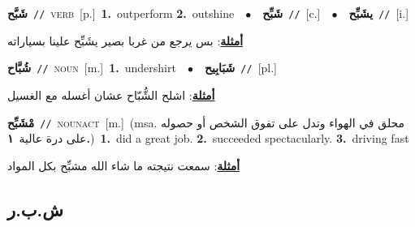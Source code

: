 \documentclass[10pt,a4paper,twoside]{article} %
\begin{document}
\begin{multicols}{2}
{\setlength\topsep{0pt}\textbf{\foreignlanguage{arabic}{شَبَّح}}\ {\color{gray}\texttt{//}\color{black}}\ \textsc{verb}\ [p.]\ \textbf{1.}~outperform  \textbf{2.}~outshine\ \ $\bullet$\ \ \setlength\topsep{0pt}\textbf{\foreignlanguage{arabic}{شَبِّح}}\ {\color{gray}\texttt{//}\color{black}}\ [c.]\ \ $\bullet$\ \ \setlength\topsep{0pt}\textbf{\foreignlanguage{arabic}{يشَبِّح}}\ {\color{gray}\texttt{//}\color{black}}\ [i.]\  \begin{flushright}\color{gray}\foreignlanguage{arabic}{\textbf{\underline{\foreignlanguage{arabic}{أمثلة}}}: بس يرجع من غربا بصير يشَبِّح علينا بسياراته}\end{flushright}\color{black}} \vspace{2mm}

{\setlength\topsep{0pt}\textbf{\foreignlanguage{arabic}{شُبَّاح}}\ {\color{gray}\texttt{//}\color{black}}\ \textsc{noun}\ [m.]\ \textbf{1.}~undershirt\ \ $\bullet$\ \ \setlength\topsep{0pt}\textbf{\foreignlanguage{arabic}{شَبَابِيح}}\ {\color{gray}\texttt{//}\color{black}}\ [pl.]\  \begin{flushright}\color{gray}\foreignlanguage{arabic}{\textbf{\underline{\foreignlanguage{arabic}{أمثلة}}}: اشلح الشُّبّاح عشان أغسله مع الغسيل}\end{flushright}\color{black}} \vspace{2mm}

{\setlength\topsep{0pt}\textbf{\foreignlanguage{arabic}{مْشَبِّح}}\ {\color{gray}\texttt{//}\color{black}}\ \textsc{noun\textunderscore act}\ [m.]\ \color{gray}(msa. \foreignlanguage{arabic}{محلق في الهواء وتدل على تفوق الشخص أو حصوله على درة عالية}~\foreignlanguage{arabic}{\textbf{١.}})\color{black}\ \textbf{1.}~did a great job.  \textbf{2.}~succeeded spectacularly.  \textbf{3.}~driving fast\  \begin{flushright}\color{gray}\foreignlanguage{arabic}{\textbf{\underline{\foreignlanguage{arabic}{أمثلة}}}: سمعت نتيجته ما شاء الله مشبِّح بكل المواد}\end{flushright}\color{black}} \vspace{2mm}

\vspace{-3mm}
\subsection*{\color{blue}\foreignlanguage{arabic}{ش.ب.ر}\color{blue}{}} 


\end{multicols}
\end{document}
